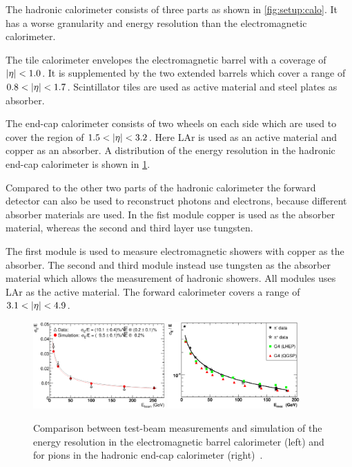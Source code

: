 The hadronic calorimeter consists of three parts as shown in \cref{fig:setup:calo}.
It has a worse granularity and energy resolution than the electromagnetic calorimeter.

The tile calorimeter envelopes the electromagnetic barrel with a coverage of $\left|\eta\right| < 1.0$.
It is supplemented by the two extended barrels which cover a range of $0.8 < \left|\eta\right| < 1.7$.
Scintillator tiles are used as active material and steel plates as absorber.

The end-cap calorimeter consists of two wheels on each side which are used to cover the region of $1.5 < \left|\eta\right| < 3.2$.
Here LAr is used as an active material and copper as an absorber.
A distribution of the energy resolution in the hadronic end-cap calorimeter is shown in \cref{fig:setup:calo:eres}.

Compared to the other two parts of the hadronic calorimeter the forward detector can also be used to reconstruct photons
and electrons, because different absorber materials are used.
In the fist module copper is used as the absorber material, whereas the second and third layer use tungsten.

The first module is used to measure electromagnetic showers with copper as the absorber.
The second and third module instead use tungsten as the absorber material which allows the measurement of hadronic showers.
All modules uses LAr as the active material.
The forward calorimeter covers a range of $3.1 < \left|\eta\right| < 4.9$.

\begin{figure}[htb]
    \centering
    \includegraphics[width=0.45\textwidth]{./figures/setup/eres_ecal_barrel.eps}
    \includegraphics[width=0.45\textwidth]{./figures/setup/eres_hcal.eps}
    \caption{Comparison between test-beam measurements and simulation of the energy resolution
            in the electromagnetic barrel calorimeter (left) and for pions in the
            hadronic end-cap calorimeter (right)~\cite{ATLAS}.}\label{fig:setup:calo:eres}
\end{figure}


